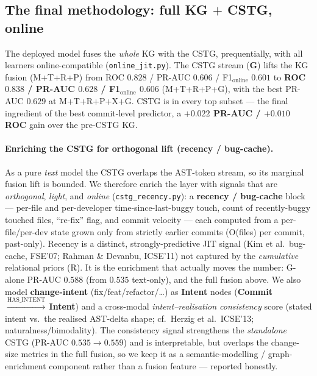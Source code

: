 \documentclass[11pt,a4paper]{article}
\newcommand{\node}[1]{\textcolor{kgblue}{\textbf{#1}}}
\begin{document}
	\subsection{\texorpdfstring{The final methodology: full KG $+$ CSTG, online}{The final methodology: full KG + CSTG, online}}\label{sec:cstgfinal}
	The deployed model fuses the \emph{whole} KG with the CSTG, prequentially, with all
	learners online-compatible (\texttt{online\_jit.py}). The CSTG stream (\textbf{G})
	lifts the KG fusion (M+T+R+P) from ROC $0.828$ / PR-AUC $0.606$ /
	F1$_{\mathrm{online}}$ $0.601$ to \textbf{ROC $0.838$ / PR-AUC $0.628$ /
	F1$_{\mathrm{online}}$ $0.606$} (M+T+R+P+G), with the best PR-AUC $\mathbf{0.629}$ at
	M+T+R+P+X+G. CSTG is in every top subset --- the final ingredient of the best
	commit-level predictor, a \textbf{$+0.022$ PR-AUC / $+0.010$ ROC} gain over the
	pre-CSTG KG.

	\paragraph{Enriching the CSTG for orthogonal lift (recency / bug-cache).}
	As a pure \emph{text} model the CSTG overlaps the AST-token stream, so its marginal
	fusion lift is bounded. We therefore enrich the layer with signals that are
	\emph{orthogonal}, \emph{light}, and \emph{online} (\texttt{cstg\_recency.py}): a
	\textbf{recency / bug-cache} block --- per-file and per-developer time-since-last-buggy
	touch, count of recently-buggy touched files, ``re-fix'' flag, and commit velocity ---
	each computed from a per-file/per-dev state grown only from strictly earlier commits
	(O(files) per commit, past-only). Recency is a distinct, strongly-predictive JIT
	signal (Kim et al.\ bug-cache, FSE'07; Rahman \& Devanbu, ICSE'11) not captured by the
	\emph{cumulative} relational priors (R). It is the enrichment that actually moves the
	number: G-alone PR-AUC $0.588$ (from $0.535$ text-only), and the full fusion above.
	We also model \textbf{change-intent} (fix/feat/refactor/\ldots) as \node{Intent} nodes
	(\node{Commit}\,$\xrightarrow{\text{HAS\_INTENT}}$\,\node{Intent}) and a cross-modal
	\emph{intent--realisation consistency} score (stated intent vs.\ the realised
	AST-delta shape; cf.\ Herzig et al.\ ICSE'13; naturalness/bimodality). The
	consistency signal strengthens the \emph{standalone} CSTG (PR-AUC
	$0.535\!\rightarrow\!0.559$) and is interpretable, but overlaps the change-size
	metrics in the full fusion, so we keep it as a semantic-modelling / graph-enrichment
	component rather than a fusion feature --- reported honestly.
\end{document}
